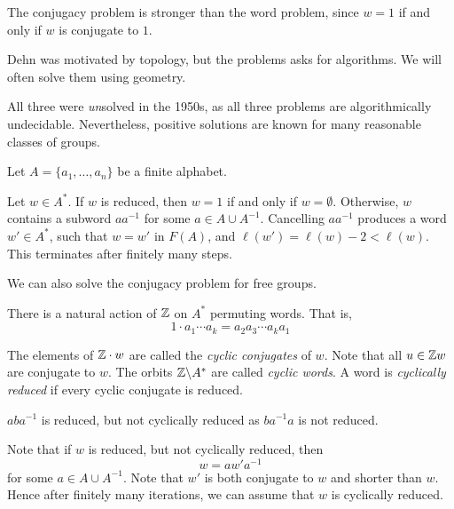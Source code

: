 \documentclass{article}
\begin{document}
\lec

\begin{remark}
    The conjugacy problem is stronger than the word problem, since \(w = 1\) if and only if \(w\) is conjugate to \(1\).

    Dehn was motivated by topology, but the problems asks for algorithms. We will often solve them using geometry.

    All three were \emph{un}solved in the 1950s, as all three problems are algorithmically undecidable. Nevertheless, positive solutions are known for many reasonable classes of groups.
\end{remark}

Let \(A = \{a_1, \dots, a_n\}\) be a finite alphabet.

\begin{example}

    Let \(w \in A^*\). If \(w\) is reduced, then \(w = 1\) if and only if \(w = \emptyset\). Otherwise, \(w\) contains a subword \(aa^{-1}\) for some \(a \in A \cup A^{-1}\). Cancelling \(aa^{-1}\) produces a word \(w' \in A^*\), such that \(w = w'\) in \(F(A)\), and \(\ell(w') = \ell(w) - 2 < \ell(w)\). This terminates after finitely many steps. 
\end{example}

We can also solve the conjugacy problem for free groups.

\begin{definition}
    There is a natural action of \(\mathbb{Z}\) on \(A^*\) permuting words. That is,
    \[1\cdot a_1\cdots a_k = a_2a_3\cdots a_ka_1\]
\end{definition}

The elements of \(\mathbb{Z} \cdot w\) are called the \emph{cyclic conjugates} of \(w\). Note that all \(u \in \mathbb{Z} w\) are conjugate to \(w\). The orbits \(\mathbb{Z} \backslash A^*\) are called \emph{cyclic words}. A word is \emph{cyclically reduced} if every cyclic conjugate is reduced.

\begin{example}
    \(aba^{-1}\) is reduced, but not cyclically reduced as \(ba^{-1}a\) is not reduced.
\end{example}

Note that if \(w\) is reduced, but not cyclically reduced, then
\[w = aw'a^{-1}\]
for some \(a \in A \cup A^{-1}\). Note that \(w'\) is both conjugate to \(w\) and shorter than \(w\). Hence after finitely many iterations, we can assume that \(w\) is cyclically reduced.
\end{document}
